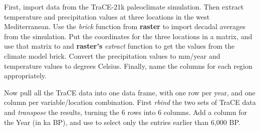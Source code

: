 \documentclass[11pt,]{tufte-handout}
\newenvironment{Shaded}{}{}
\newcommand{\KeywordTok}[1]{\textcolor[rgb]{0.00,0.44,0.13}{\textbf{{#1}}}}
\newcommand{\DataTypeTok}[1]{\textcolor[rgb]{0.56,0.13,0.00}{{#1}}}
\newcommand{\DecValTok}[1]{\textcolor[rgb]{0.25,0.63,0.44}{{#1}}}
\newcommand{\FloatTok}[1]{\textcolor[rgb]{0.25,0.63,0.44}{{#1}}}
\newcommand{\StringTok}[1]{\textcolor[rgb]{0.25,0.44,0.63}{{#1}}}
\newcommand{\CommentTok}[1]{\textcolor[rgb]{0.38,0.63,0.69}{\textit{{#1}}}}
\newcommand{\NormalTok}[1]{{#1}}
\begin{document}
First, import data from the TraCE-21k paleoclimate simulation. Then
extract temperature and precipitation values at three locations in the
west Mediterranean. Use the \emph{brick} function from \textbf{raster}
to import decadal averages from the simulation. Put the coordinates for
the three locations in a matrix, and use that matrix to and
\textbf{raster's} \emph{extract} function to get the values from the
climate model brick. Convert the precipitation values to mm/year and
temperature values to degrees Celsius. Finally, name the columns for
each region appropriately.

Now pull all the TraCE data into one data frame, with one row per year,
and one column per variable/location combination. First \emph{rbind} the
two sets of TraCE data and \emph{transpose} the results, turning the 6
rows into 6 columns. Add a column for the Year (in ka BP), and use to
select only the entries earlier than 6,000 BP.

\begin{Shaded}
\end{Shaded}
\end{document}
